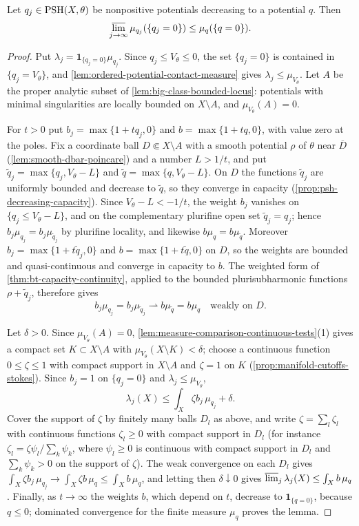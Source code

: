 \begin{lemma}\label{lem:decreasing-zero-contact-mass}
Let $q_j\in\mathrm{PSH}(X,\theta)$ be nonpositive potentials decreasing to a potential $q$. Then
\[
 \varlimsup_{j\to\infty}\mu_{q_j}(\{q_j=0\})\leq\mu_q(\{q=0\}).
\]
\end{lemma}
\begin{proof}
Put $\lambda_j=\mathbf1_{\{q_j=0\}}\mu_{q_j}$. Since $q_j\leq V_\theta\leq0$, the set $\{q_j=0\}$ is contained in $\{q_j=V_\theta\}$, and \cref{lem:ordered-potential-contact-measure} gives $\lambda_j\leq\mu_{V_\theta}$. Let $A$ be the proper analytic subset of \cref{lem:big-class-bounded-locus}: potentials with minimal singularities are locally bounded on $X\setminus A$, and $\mu_{V_\theta}(A)=0$.

For $t>0$ put $b_j=\max\{1+tq_j,0\}$ and $b=\max\{1+tq,0\}$, with value zero at the poles. Fix a coordinate ball $D\Subset X\setminus A$ with a smooth potential $\rho$ of $\theta$ near $\overline D$ (\cref{lem:smooth-dbar-poincare}) and a number $L>1/t$, and put $\widetilde q_j=\max\{q_j,V_\theta-L\}$ and $\widetilde q=\max\{q,V_\theta-L\}$. On $D$ the functions $\widetilde q_j$ are uniformly bounded and decrease to $\widetilde q$, so they converge in capacity (\cref{prop:psh-decreasing-capacity}). Since $V_\theta-L<-1/t$, the weight $b_j$ vanishes on $\{q_j\leq V_\theta-L\}$, and on the complementary plurifine open set $\widetilde q_j=q_j$; hence $b_j\mu_{q_j}=b_j\mu_{\widetilde q_j}$ by plurifine locality, and likewise $b\mu_q=b\mu_{\widetilde q}$. Moreover $b_j=\max\{1+t\widetilde q_j,0\}$ and $b=\max\{1+t\widetilde q,0\}$ on $D$, so the weights are bounded and quasi-continuous and converge in capacity to $b$. The weighted form of \cref{thm:bt-capacity-continuity}, applied to the bounded plurisubharmonic functions $\rho+\widetilde q_j$, therefore gives
\[
 b_j\mu_{q_j}=b_j\mu_{\widetilde q_j}
                 \rightharpoonup b\mu_{\widetilde q}=b\mu_q
 \quad\text{weakly on }D.
\]

Let $\delta>0$. Since $\mu_{V_\theta}(A)=0$, \cref{lem:measure-comparison-continuous-tests}(1) gives a compact set $K\subset X\setminus A$ with $\mu_{V_\theta}(X\setminus K)<\delta$; choose a continuous function $0\leq\zeta\leq1$ with compact support in $X\setminus A$ and $\zeta=1$ on $K$ (\cref{prop:manifold-cutoffs-stokes}). Since $b_j=1$ on $\{q_j=0\}$ and $\lambda_j\leq\mu_{V_\theta}$,
\[
 \lambda_j(X)\leq\int_X\zeta b_j\,\mu_{q_j}+\delta.
\]
Cover the support of $\zeta$ by finitely many balls $D_l$ as above, and write $\zeta=\sum_l\zeta_l$ with continuous functions $\zeta_l\geq0$ with compact support in $D_l$ (for instance $\zeta_l=\zeta\psi_l/\sum_k\psi_k$, where $\psi_l\geq0$ is continuous with compact support in $D_l$ and $\sum_k\psi_k>0$ on the support of $\zeta$). The weak convergence on each $D_l$ gives $\int_X\zeta b_j\,\mu_{q_j}\to\int_X\zeta b\,\mu_q\leq\int_Xb\,\mu_q$, and letting then $\delta\downarrow0$ gives $\varlimsup_j\lambda_j(X)\leq\int_Xb\,\mu_q$. Finally, as $t\to\infty$ the weights $b$, which depend on $t$, decrease to $\mathbf1_{\{q=0\}}$, because $q\leq0$; dominated convergence for the finite measure $\mu_q$ proves the lemma.
\end{proof}

